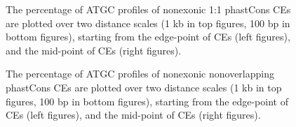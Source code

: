 \documentclass[12pt]{report}
\begin{document}
\begin{figure}[htbp]
\centering
{}
\caption{The percentage of ATGC profiles of nonexonic 1:1 phastCons CEs are plotted over two distance scales (1 kb in top figures, 100 bp in bottom figures), starting from the edge-point of CEs (left figures), and the mid-point of CEs (right figures).}
\label{fig:ATGC_1_1_phast}
\end{figure}

\begin{figure}[htbp]
\centering
{}
\caption{The percentage of ATGC profiles of nonexonic nonoverlapping phastCons CEs are plotted over two distance scales (1 kb in top figures, 100 bp in bottom figures), starting from the edge-point of CEs (left figures), and the mid-point of CEs (right figures).}
\label{fig:nonoverla_ATGC}
\end{figure}
\end{document}
